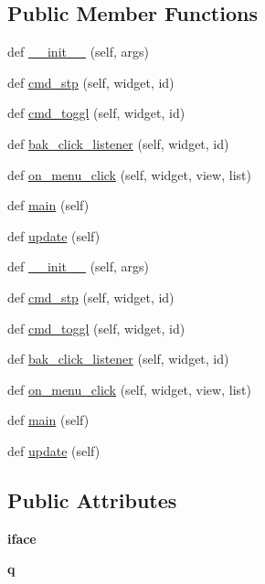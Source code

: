 \subsection*{Public Member Functions}
\begin{DoxyCompactItemize}
\item 
def \hyperlink{classmonitor_1_1MyApp_a47a59d4b9b135d3562d6092363a65608}{\+\_\+\+\_\+init\+\_\+\+\_\+} (self, args)
\item 
def \hyperlink{classmonitor_1_1MyApp_ace10b1281ba20d05145509d837950266}{cmd\+\_\+stp} (self, widget, id)
\item 
def \hyperlink{classmonitor_1_1MyApp_a6d0ff5777d9ecd221be849d5f3a42539}{cmd\+\_\+toggl} (self, widget, id)
\item 
def \hyperlink{classmonitor_1_1MyApp_a12a7e1c078a2ce6a190b019613a081de}{bak\+\_\+click\+\_\+listener} (self, widget, id)
\item 
def \hyperlink{classmonitor_1_1MyApp_a9b575be75a07361df67ebf7508b2820e}{on\+\_\+menu\+\_\+click} (self, widget, view, list)
\item 
def \hyperlink{classmonitor_1_1MyApp_a2bac7d4555fa6e81dee2887060f3ff0e}{main} (self)
\item 
def \hyperlink{classmonitor_1_1MyApp_ac04b8f7a80227357fd7899a73b2fdf93}{update} (self)
\item 
def \hyperlink{classmonitor_1_1MyApp_a47a59d4b9b135d3562d6092363a65608}{\+\_\+\+\_\+init\+\_\+\+\_\+} (self, args)
\item 
def \hyperlink{classmonitor_1_1MyApp_ace10b1281ba20d05145509d837950266}{cmd\+\_\+stp} (self, widget, id)
\item 
def \hyperlink{classmonitor_1_1MyApp_a6d0ff5777d9ecd221be849d5f3a42539}{cmd\+\_\+toggl} (self, widget, id)
\item 
def \hyperlink{classmonitor_1_1MyApp_a12a7e1c078a2ce6a190b019613a081de}{bak\+\_\+click\+\_\+listener} (self, widget, id)
\item 
def \hyperlink{classmonitor_1_1MyApp_a9b575be75a07361df67ebf7508b2820e}{on\+\_\+menu\+\_\+click} (self, widget, view, list)
\item 
def \hyperlink{classmonitor_1_1MyApp_a2bac7d4555fa6e81dee2887060f3ff0e}{main} (self)
\item 
def \hyperlink{classmonitor_1_1MyApp_ac04b8f7a80227357fd7899a73b2fdf93}{update} (self)
\end{DoxyCompactItemize}
\subsection*{Public Attributes}
\begin{DoxyCompactItemize}
\item 
{\bfseries iface}\hypertarget{classmonitor_1_1MyApp_a7479bcc65203fa0200a4b6cf49c18f14}{}\label{classmonitor_1_1MyApp_a7479bcc65203fa0200a4b6cf49c18f14}

\item 
{\bfseries q}\hypertarget{classmonitor_1_1MyApp_a1f2d771002bb66227dec4165f1f12e29}{}\label{classmonitor_1_1MyApp_a1f2d771002bb66227dec4165f1f12e29}

\end{DoxyCompactItemize}
